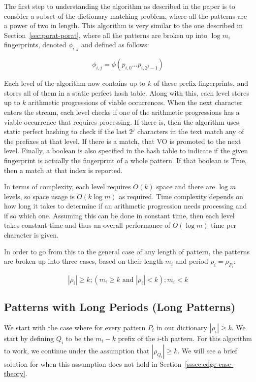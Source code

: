 \documentclass[ %
                    author={Dominic Joseph Moylett},
                    degree={MEng},
                     title={Dictionary Matching with Fingerprints},
                  subtitle={An Empirical Analysis},
                      type={research},
                      year={2015} ]{dissertation}
\begin{document}
The first step to understanding the algorithm as described in the paper is to consider a subset of the dictionary matching problem, where all the patterns are a power of two in length. This algorithm is very similar to the one described in Section~\ref{sec:porat-porat}, where all the patterns are broken up into $\log m_i$ fingerprints, denoted $\phi_{i,j}$ and defined as follows:

$$\phi_{i,j} = \phi(p_{i,0}...p_{i,2^j-1})$$

Each level of the algorithm now contains up to $k$ of these prefix fingerprints, and stores all of them in a static perfect hash table. Along with this, each level stores up to $k$ arithmetic progressions of viable occurrences. When the next character enters the stream, each level checks if one of the arithmetic progressions has a viable occurrence that requires processing. If there is, then the algorithm uses static perfect hashing to check if the last $2^j$ characters in the text match any of the prefixes at that level. If there is a match, that VO is promoted to the next level. Finally, a boolean is also specified in the hash table to indicate if the given fingerprint is actually the fingerprint of a whole pattern. If that boolean is True, then a match at that index is reported.

In terms of complexity, each level requires $O(k)$ space and there are $\log m$ levels, so space usage is $O(k\log m)$ as required. Time complexity depends on how long it takes to determine if an arithmetic progression needs processing and if so which one. Assuming this can be done in constant time, then each level takes constant time and thus an overall performance of $O(\log m)$ time per character is given.

In order to go from this to the general case of any length of pattern, the patterns are broken up into three cases, based on their length $m_i$ and period $\rho_i = \rho_{P_i}$:

$$|\rho_i| \geq k; (m_i \geq k \text{ and } |\rho_i| < k); m_i < k$$

\subsection{Patterns with Long Periods (Long Patterns)}
\label{ssec:long-theory}

We start with the case where for every pattern $P_i$ in our dictionary $|\rho_i| \geq k$. We start by defining $Q_i$ to be the $m_i - k$ prefix of the $i$-th pattern. For this algorithm to work, we continue under the assumption that $|\rho_{Q_i}| \geq k$. We will see a brief solution for when this assumption does not hold in Section~\ref{sssec:edge-case-theory}.
\end{document}

